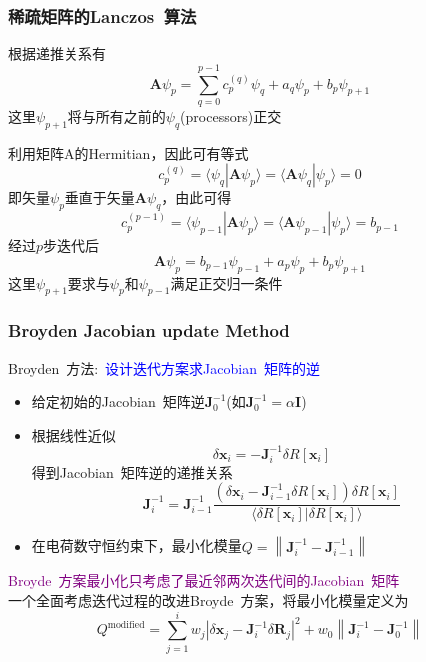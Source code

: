 \documentclass[cjk,slidestop,compress,mathserif,blue]{beamer}
\begin{document}
\frame
{
	\frametitle{稀疏矩阵的\textrm{Lanczos~}算法}
	根据递推关系有
	\begin{displaymath}
		\mathbf{A}\psi_p=\sum_{q=0}^{p-1}c_p^{(q)}\psi_q+a_q\psi_p+b_p\psi_{p+1}
	\end{displaymath}
	这里$\psi_{p+1}$将与所有之前的$\psi_q$(\textrm{processors})正交

	利用矩阵$\mathrm{A}$的\textrm{Hermitian}，因此可有等式
	\begin{displaymath}
		c_p^{(q)}=\langle\psi_q|\mathbf{A}\psi_p\rangle=\langle\mathbf{A}\psi_q|\psi_p\rangle=0
	\end{displaymath}
	即矢量$\psi_p$垂直于矢量$\mathbf{A}\psi_q$，由此可得
	\begin{displaymath}
		c_p^{(p-1)}=\langle\psi_{p-1}|\mathbf{A}\psi_p\rangle=\langle\mathbf{A}\psi_{p-1}|\psi_p\rangle=b_{p-1}
	\end{displaymath}
	经过$p$步迭代后
	\begin{displaymath}
		\mathbf{A}\psi_p=b_{p-1}\psi_{p-1}+a_p\psi_p+b_p\psi_{p+1}
	\end{displaymath}
	这里$\psi_{p+1}$要求与$\psi_p$和$\psi_{p-1}$满足正交归一条件
}
\frame
{
	\frametitle{\textrm{Broyden Jacobian update Method}}
	\textrm{Broyden~}方法:~\textcolor{blue}{设计迭代方案求\textrm{Jacobian~}矩阵的逆}
	\begin{itemize}
		\item 给定初始的\textrm{Jacobian~}矩阵逆$\mathbf{J}_0^{-1}$(如$\mathbf{J}_0^{-1}=\alpha\mathbf{I}$)
		\item 根据线性近似
			\begin{displaymath}
				\delta\mathbf{x}_{i}=-\mathbf{J}_i^{-1}\delta R[\mathbf{x}_{i}]
			\end{displaymath}
		得到\textrm{Jacobian~}矩阵逆的递推关系
			\begin{displaymath}
				\mathbf{J}_{i}^{-1}=\mathbf{J}_{i-1}^{-1}\dfrac{(\delta\mathbf{x}_i-\mathbf{J}_{i-1}^{-1}\delta R[\mathbf{x}_{i}])\delta R[\mathbf{x}_{i}]}{\langle\delta R[\mathbf{x}_{i}]|\delta R[\mathbf{x}_{i}]\rangle}
			\end{displaymath}
		\item 在电荷数守恒约束下，最小化模量$Q=\left\|\mathbf{J}_i^{-1}-\mathbf{J}_{i-1}^{-1}\right\|$
	\end{itemize}
	\textcolor{purple}{\textrm{Broyde~}方案最小化只考虑了最近邻两次迭代间的\textrm{Jacobian~}矩阵}\\
	一个全面考虑迭代过程的改进\textrm{Broyde~}方案，将最小化模量定义为
	\begin{displaymath}
		Q^{\mathrm{modified}}=\sum_{j=1}^{i}w_j|\delta\mathbf{x}_j-\mathbf{J}_i^{-1}\delta\mathbf{R}_j|^2+w_0\left\|\mathbf{J}_i^{-1}-\mathbf{J}_{0}^{-1}\right\|
	\end{displaymath}
}
\end{document}

